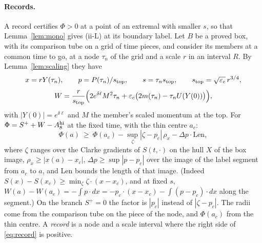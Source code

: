 \documentclass[11pt]{article}
\theoremstyle{definition}
\begin{document}
\paragraph{Records.} A record certifies $\Phi>0$ at a point of an extremal with smaller $s$, so that Lemma~\ref{lem:mono}
gives (ii-L) at its boundary label. Let $B$ be a proved box, with its comparison tube on a grid of time pieces, and
consider its members at a common time to go, at a node $\tau_n$ of the grid and a scale $r$ in an interval $R$. By
Lemma~\ref{lem:scaling} they have
\[
x=rY(\tau_n),\qquad p=P(\tau_n)/s_{\rm top},\qquad s=\tau_ns_{\rm top},\qquad s_{\rm top}=\sqrt{\varepsilon_c}\,r^{3/4},
\]
\[
W=\frac{r}{s_{\rm top}}\Bigl(2e^{\delta\ell}M^2\tau_n+\varepsilon_c\bigl(2m(\tau_n)-\tau_nU(Y(0))\bigr)\Bigr),
\]
with $|Y(0)|=e^{\delta\ell}$ and $M$ the member's scaled momentum at the top. For $\Phi=S^++W-A_8^{\rm hi}$ at the fixed
time, with the thin centre $a_c$:
\begin{equation}\label{eq:record}
\Phi(a)\ \ge\ \Phi(a_c)-\sup_{\zeta}|\zeta-p_c|\,\rho_x-\Delta p\cdot\mathrm{Len},
\end{equation}
where $\zeta$ ranges over the Clarke gradients of $S(t,\cdot)$ on the hull $X$ of the box image, $\rho_x\ge|x(a)-x_c|$,
$\Delta p\ge\sup|p-p_c|$ over the image of the label segment from $a_c$ to $a$, and Len bounds the length of that image.
(Indeed $S(x)-S(x_c)\ge\min_\zeta\zeta\cdot(x-x_c)$, and at fixed $s$,
$W(a)-W(a_c)=-\int p\cdot dx=-p_c\cdot(x-x_c)-\int(p-p_c)\cdot dx$ along the segment.) On the branch $S^+=0$ the factor
is $|p_c|$ instead of $|\zeta-p_c|$. The radii come from the comparison tube on the piece of the node, and $\Phi(a_c)$
from the thin centre. A \emph{record} is a node and a scale interval where the right side of \eqref{eq:record} is
positive.
\end{document}
